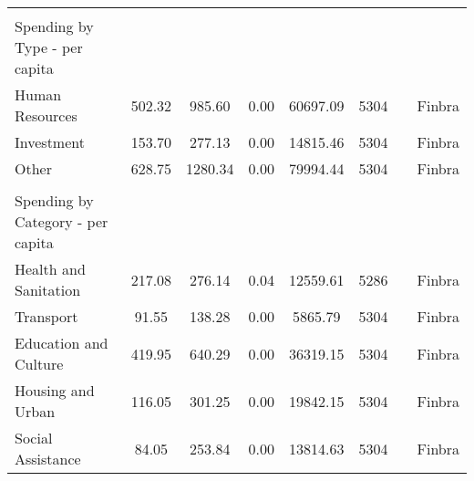 \begin{table}[H]
\begin{footnotesize}
\begin{center}
{\begin{threeparttable}[b]
\begin{tabular}{rrrrrrrr}
          &       &       &       &       &       &       &  \\
    \multicolumn{1}{l}{Spending by Type - per capita} &       &       &       &       &       &       &  \\
    \multicolumn{1}{l}{Human Resources} & \multicolumn{1}{c}{502.32} & \multicolumn{1}{c}{985.60} & \multicolumn{1}{c}{0.00} & \multicolumn{1}{c}{60697.09} & \multicolumn{1}{c}{5304} &       & \multicolumn{1}{c}{Finbra} \\
    \multicolumn{1}{l}{Investment} & \multicolumn{1}{c}{153.70} & \multicolumn{1}{c}{277.13} & \multicolumn{1}{c}{0.00} & \multicolumn{1}{c}{14815.46} & \multicolumn{1}{c}{5304} &       & \multicolumn{1}{c}{Finbra} \\
    \multicolumn{1}{l}{Other} & \multicolumn{1}{c}{628.75} & \multicolumn{1}{c}{1280.34} & \multicolumn{1}{c}{0.00} & \multicolumn{1}{c}{79994.44} & \multicolumn{1}{c}{5304} &       & \multicolumn{1}{c}{Finbra} \\
          &       &       &       &       &       &       &  \\
    \multicolumn{1}{l}{Spending by Category - per capita} &       &       &       &       &       &       &  \\
    \multicolumn{1}{l}{Health and Sanitation} & \multicolumn{1}{c}{217.08} & \multicolumn{1}{c}{276.14} & \multicolumn{1}{c}{0.04} & \multicolumn{1}{c}{12559.61} & \multicolumn{1}{c}{5286} &       & \multicolumn{1}{c}{Finbra} \\
    \multicolumn{1}{l}{Transport} & \multicolumn{1}{c}{91.55} & \multicolumn{1}{c}{138.28} & \multicolumn{1}{c}{0.00} & \multicolumn{1}{c}{5865.79} & \multicolumn{1}{c}{5304} &       & \multicolumn{1}{c}{Finbra} \\
    \multicolumn{1}{l}{Education and Culture} & \multicolumn{1}{c}{419.95} & \multicolumn{1}{c}{640.29} & \multicolumn{1}{c}{0.00} & \multicolumn{1}{c}{36319.15} & \multicolumn{1}{c}{5304} &       & \multicolumn{1}{c}{Finbra} \\
    \multicolumn{1}{l}{Housing and Urban} & \multicolumn{1}{c}{116.05} & \multicolumn{1}{c}{301.25} & \multicolumn{1}{c}{0.00} & \multicolumn{1}{c}{19842.15} & \multicolumn{1}{c}{5304} &       & \multicolumn{1}{c}{Finbra} \\
    \multicolumn{1}{l}{Social Assistance} & \multicolumn{1}{c}{84.05} & \multicolumn{1}{c}{253.84} & \multicolumn{1}{c}{0.00} & \multicolumn{1}{c}{13814.63} & \multicolumn{1}{c}{5304} &       & \multicolumn{1}{c}{Finbra} \\

\end{tabular}
\end{threeparttable}}
\end{center}
\end{footnotesize}
\end{table}

